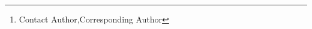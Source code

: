 \documentclass[]{article}
\title{\mytitle}
\author{
Shusaku Sone$^1$\and
Jiaxin Ma$^1$\and
Atsushi Hashimoto$^1$\footnote{Contact Author,Corresponding Author}\and
Naoya Chiba$^{1,2}$\And
Yoshitaka Ushiku$^1$
\\
\affiliations
$^1$OMRON SINIC X Corporation, $^2$Tohoku University\\
\emails
\{atsushi.hashimoto,shusaku.sone\}@sinicx.com}
\author{
Anonymous Authors$^1$\\%
\affiliations
$^1$Anonymous Affiliations\\
\emails
anonymous@example.com
}
\begin{document}
\maketitle

\begin{abstract}

\end{abstract}







\newpage


\end{document}

